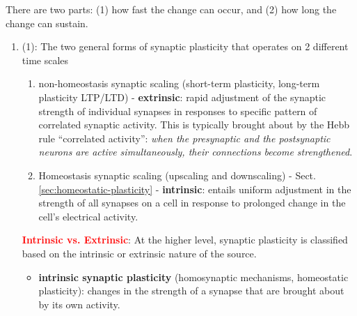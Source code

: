 There are two parts: (1) how fast the change can occur, and (2) how long the
change can sustain.
\begin{enumerate}
  \item (1):  The two general forms of synaptic plasticity that operates
on 2 different time scales
\begin{enumerate}
  
  \item non-homeostasis synaptic scaling (short-term plasticity, long-term
  plasticity LTP/LTD) - {\bf extrinsic}:
  rapid adjustment of the synaptic strength of individual synapses in responses
  to specific pattern of correlated synaptic activity.
   This is typically brought
  about by the Hebb rule ``correlated activity'': {\it when the presynaptic and
  the postsynaptic neurons are active simultaneously, their connections become
  strengthened}.
    
  \item Homeostasis synaptic scaling (upscaling and downscaling) -
  Sect.\ref{sec:homeostatic-plasticity} - {\bf intrinsic}:
  entails uniform adjustment in the strength of all synapses on a cell in response to
   prolonged change in the cell's electrical activity.
\end{enumerate}

\begin{mdframed}
\textcolor{red}{\bf Intrinsic vs. Extrinsic}:
At the higher level, synaptic plasticity is classified based on the intrinsic or
extrinsic nature of the source.
\begin{itemize}
  \item {\bf intrinsic synaptic plasticity} (homosynaptic mechanisms,
  homeostatic plasticity):  changes in the strength of a synapse that are brought about by its own
   activity. %
   
 
   
  

\end{itemize}
\end{mdframed}
\end{enumerate}
